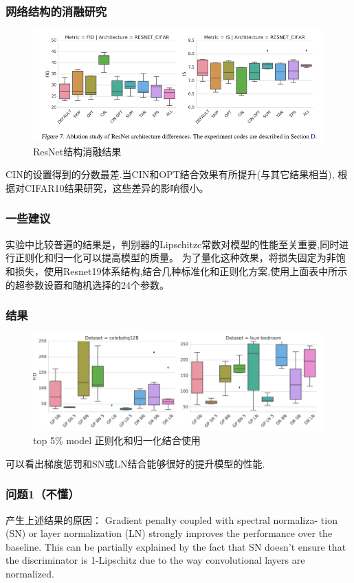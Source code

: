 \documentclass{beamer}
\begin{document}
\begin{frame}[c]\frametitle{网络结构的消融研究}
    \begin{figure}[top]
        \centering
        \includegraphics[scale=0.5]{result7.png} 
        \caption{ResNet结构消融结果}
    \end{figure}
    CIN的设置得到的分数最差.当CIN和OPT结合效果有所提升(与其它结果相当),
    根据对CIFAR10结果研究，这些差异的影响很小。
\end{frame}

\begin{frame}[c]\frametitle{一些建议}
    实验中比较普遍的结果是，判别器的Lipschitzc常数对模型的性能至关重要,同时进行正则化和归一化可以提高模型的质量。
    为了量化这种效果，将损失固定为非饱和损失，使用Resnet19体系结构,结合几种标准化和正则化方案,使用上面表中所示的超参数设置和随机选择的24个参数。
\end{frame}

\begin{frame}[c]\frametitle{结果}
    \begin{figure}[top]
        \centering
        \includegraphics[scale=0.5]{result4.png} 
        \caption{top 5\% model 正则化和归一化结合使用}
    \end{figure}
    可以看出梯度惩罚和SN或LN结合能够很好的提升模型的性能.
\end{frame}

\begin{frame}[c]\frametitle{问题1（不懂）}
    产生上述结果的原因：
    \color{red} Gradient penalty coupled with spectral normaliza-
    tion (SN) or layer normalization (LN) strongly improves the performance over the baseline. This can be partially explained by the fact
    that SN doesn’t ensure that the discriminator is 1-Lipschitz due to the way convolutional layers are normalized.
\end{frame}
\end{document}
